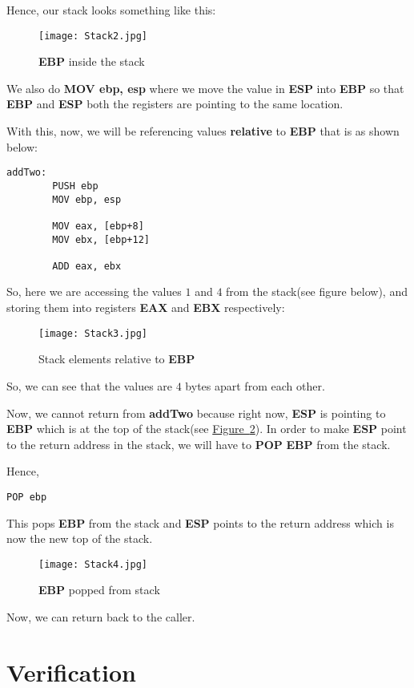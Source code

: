 \documentclass{article}
\begin{document}
Hence, our stack looks something like this:
\begin{figure}[h]
	\centering
	\texttt{[image: Stack2.jpg]}
	\caption{\textbf{EBP} inside the stack}
	\label{fig:fig2}
\end{figure}

We also do \textbf{MOV ebp, esp} where we move the value in \textbf{ESP} into \textbf{EBP} so that \textbf{EBP} and \textbf{ESP} both the registers are pointing to the same location.

With this, now, we will be referencing values \textbf{relative} to \textbf{EBP} that is as shown below:
\begin{lstlisting}[frame=single, breaklines=true]
	addTwo:
		PUSH ebp
		MOV ebp, esp
		
		MOV eax, [ebp+8]
		MOV ebx, [ebp+12]
		
		ADD eax, ebx
\end{lstlisting}
\newpage
So, here we are accessing the values $1$ and $4$ from the stack(see figure below), and storing them into registers \textbf{EAX} and \textbf{EBX} respectively:
\begin{figure}[h]
	\centering
	\texttt{[image: Stack3.jpg]}
	\caption{Stack elements relative to \textbf{EBP}}
	\label{fig:fig3}
\end{figure}

So, we can see that the values are $4$ bytes apart from each other.

Now, we cannot return from \textbf{addTwo} because right now, \textbf{ESP} is pointing to \textbf{EBP} which is at the top of the stack(see \hyperref[fig:fig3]{Figure~\ref{fig:fig3}}). In order to make \textbf{ESP} point to the return address in the stack, we will have to \textbf{POP} \textbf{EBP} from the stack.

Hence,
\begin{lstlisting}[frame=single, breaklines=true]
	POP ebp
\end{lstlisting}

This pops \textbf{EBP} from the stack and \textbf{ESP} points to the return address which is now the new top of the stack.
\newpage
\begin{figure}[h]
	\centering
	\texttt{[image: Stack4.jpg]}
	\caption{\textbf{EBP} popped from stack}
	\label{fig:fig4}
\end{figure}

Now, we can return back to the caller.
\newpage
\section{Verification}\label{sec:sec2}
\end{document}
